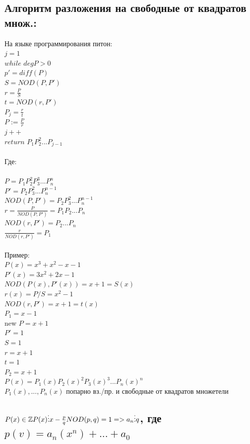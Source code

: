 \documentclass[12pt]{article}
\begin{document}
\subsection{Алгоритм разложения на свободные от  квадратов множ.:}
\noindent На языке программирования питон:
\\$j=1$
    \\$while$ $deg P>0$
\\$p' = diff(P)$
    \\$S=NOD(P,P')$
\\$r = \frac{P}{S}$
    \\$t = NOD(r,P')$
\\$P_j=\frac{r}{t}$
    \\$P:=\frac{P}{r}$
\\$j++$
    \\$return$ $P_1P^2_2...P_{j-1}$
\\
\\Где:
\\
\\$P=P_1P^2_2P^3_3...P^n_n$
    \\$P'=P_2P^2_3...P_n^{n-1}$
\\$NOD(P,P')=P_2P_3^2...P_n^{n-1}$
    \\$r=\frac{P}{NOD(P,P')}=P_1P_2...P_n$
\\$NOD(r,P')=P_2...P_n$
    \\$\frac{r}{NOD(r,P')}=P_1$
\\
\\Пример:
\\$P(x)=x^3+x^2-x-1$
    \\$P'(x)=3x^2+2x-1$
\\$NOD(P(x),P'(x))=x+1=S(x)$
    \\$r(x)= P/S=x^2-1$
\\$NOD(r,P')=x+1=t(x)$
    \\$P_1=x-1$
\\new $P=x+1$
\\$P'=1$
    \\$S=1$
\\$r = x+1$
    \\$t = 1$
\\$P_2=x+1$
    \\$P(x) = P_1(x)P_2(x)^2P_3(x)^3...P_n(x)^n$
\\$P_1(x),...,P_n(x)$ попарно вз./пр. и свободные от квадратов множетели
    \subsection{$P(x) \in\mathbb{Z} P(x)\vdots x - \frac{p}{q}\\NOD(p,q)=1 => a_n \vdots q $, где $p(v)=a_n(x^n)+...+a_0$}
\end{document}
